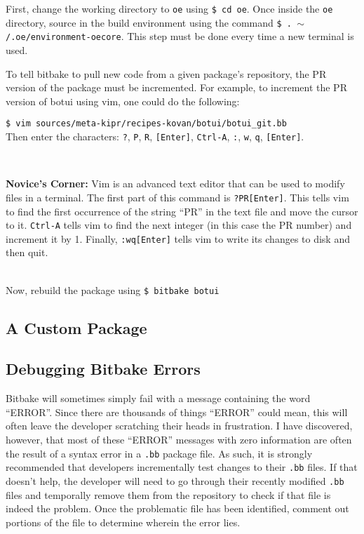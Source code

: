 \documentclass[12pt,letterpaper]{article}
\newcommand{\bcolorbox}[4]{\noindent \\ \fcolorbox{#1}{#2} {\parbox{\textwidth}{\vspace{.1em}\textbf{#3} #4\vspace{.1em}}} \\}
\newcommand{\novice}[1]{\bcolorbox{green}{Honeydew}{Novice's Corner:}{#1}}
\begin{document}
	First, change the working directory to \texttt{oe} using \texttt{\$ cd oe}. Once inside the \texttt{oe} directory, source in the build
	environment using the command \texttt{\$ . $\sim$/.oe/environment-oecore}. This step must be done every time a new terminal is used.
	
	To tell bitbake to pull new code from a given package's repository, the PR version of the package must be incremented. For example,
	to increment the PR version of botui using vim, one could do the following:
	
	\noindent \texttt{\$ vim sources/meta-kipr/recipes-kovan/botui/botui\_git.bb} \\
	\noindent Then enter the characters: \texttt{?}, \texttt{P}, \texttt{R}, \texttt{[Enter]}, \texttt{Ctrl-A}, \texttt{:}, \texttt{w}, \texttt{q}, \texttt{[Enter]}.
	
	\novice{Vim is an advanced text editor that can be used to modify files in a terminal. The first part of this command is \texttt{?PR[Enter]}.
	This tells vim to find the first occurrence of the string ``PR'' in the text file and move the cursor to it. \texttt{Ctrl-A} tells vim to
	find the next integer (in this case the PR number) and increment it by 1. Finally, \texttt{:wq[Enter]} tells vim to write its changes to disk
	and then quit.}
	
	Now, rebuild the package using \texttt{\$ bitbake botui}
	
	
	\subsection{A Custom Package}
	
	\subsection{Debugging Bitbake Errors}
	Bitbake will sometimes simply fail with a message containing the word ``ERROR''. Since there are thousands of things ``ERROR'' could
	mean, this will often leave the developer scratching their heads in frustration. I have discovered, however, that most of these ``ERROR''
	messages with zero information are often the result of a syntax error in a \texttt{.bb} package file. As such, it is strongly recommended
	that developers incrementally test changes to their \texttt{.bb} files. If that doesn't help, the developer will need to go through their
	recently modified \texttt{.bb} files and temporally remove them from the repository to check if that file is indeed the problem. Once the
	problematic file has been identified, comment out portions of the file to determine wherein the error lies.
	
\end{document}

